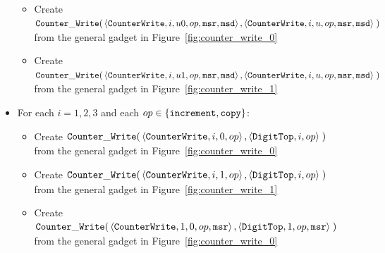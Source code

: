 \begin{itemize}
\begin{itemize}
        \item Create
        $\begin{aligned}[t]
            {\tt Counter\_Write}(& \left\langle {\tt CounterWrite}, i, u0, op, {\tt msr}, {\tt msd} \right\rangle,
                      \left\langle {\tt CounterWrite}, i, u,  op, {\tt msr}, {\tt msd} \right\rangle \;)
        \end{aligned}$ \\ from the general gadget in Figure~\ref{fig:counter_write_0}

        \item Create
        $\begin{aligned}[t]
            {\tt Counter\_Write}(& \left\langle {\tt CounterWrite}, i,  u1, op, {\tt msr}, {\tt msd}\right\rangle,
                      \left\langle {\tt CounterWrite}, i,  u,  op, {\tt msr}, {\tt msd}\right\rangle \;)
        \end{aligned}$ \\ from the general gadget in Figure~\ref{fig:counter_write_1}
        \end{itemize}

    \item For each $i = 1,2,3$ and each $op \in \{{\tt increment}, {\tt copy} \}$:
    \begin{itemize}
        \item Create
        $\begin{aligned}[t]
            {\tt Counter\_Write}(& \left\langle {\tt CounterWrite}, i, 0, op \right\rangle,
                      \left\langle {\tt DigitTop},     i,    op \right\rangle \;)
        \end{aligned}$ \\ from the general gadget in Figure~\ref{fig:counter_write_0}

        \item Create
        $\begin{aligned}[t]
            {\tt Counter\_Write}(& \left\langle {\tt CounterWrite}, i, 1, op \right\rangle,
                      \left\langle {\tt DigitTop},     i,    op \right\rangle \;)
        \end{aligned}$ \\ from the general gadget in Figure~\ref{fig:counter_write_1}

        \item Create
        $\begin{aligned}[t]
            {\tt Counter\_Write}(& \left\langle {\tt CounterWrite}, 1, 0, op, {\tt msr} \right\rangle,
                      \left\langle {\tt DigitTop},     1,    op, {\tt msr} \right\rangle \;)
        \end{aligned}$ \\ from the general gadget in Figure~\ref{fig:counter_write_0}


\end{itemize}
\end{itemize}
